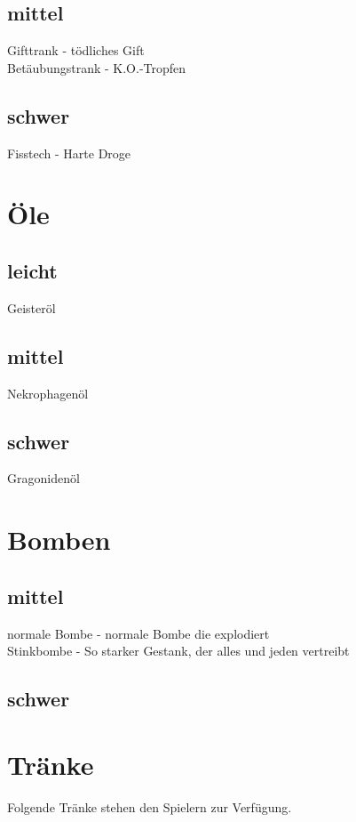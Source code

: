\subsection{mittel}
Gifttrank - tödliches Gift \\
Betäubungstrank - K.O.-Tropfen \\

\subsection{schwer}
Fisstech - Harte Droge \\


\section{Öle}
\subsection{leicht}
Geisteröl \\
\subsection{mittel}
Nekrophagenöl \\
\subsection{schwer}
Gragonidenöl \\


\section{Bomben}
\subsection{mittel}
normale Bombe - normale Bombe die explodiert \\
Stinkbombe - So starker Gestank, der alles und jeden vertreibt \\

\subsection{schwer}




\section{Tränke}
Folgende Tränke stehen den Spielern zur Verfügung. 

